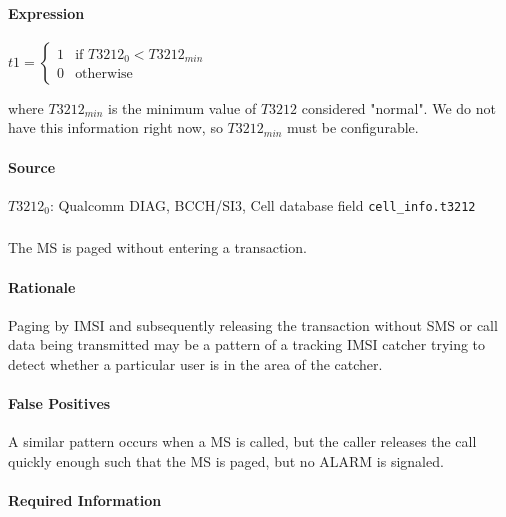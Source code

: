\documentclass[a4paper,11pt,notitlepage,bigheadings,oneside]{scrartcl}
\begin{document}
\paragraph{Expression}

$t1 =
\begin{cases}
	1 	& \text{if } T3212_0 < T3212_{min} \\
	0       & \text{otherwise}
\end{cases}$

where $T3212_{min}$ is the minimum value of $T3212$ considered "normal". We do
not have this information right now, so $T3212_{min}$ must be configurable.

\paragraph{Source}

$T3212_0$: Qualcomm DIAG, BCCH/SI3, Cell database field \verb|cell_info.t3212|



\subsubsection{}

The MS is paged without entering a transaction.

\paragraph{Rationale}

Paging by IMSI and subsequently releasing the transaction without SMS or call
data being transmitted may be a pattern of a tracking IMSI catcher trying to
detect whether a particular user is in the area of the catcher.

\paragraph{False Positives}

A similar pattern occurs when a MS is called, but the caller releases the call
quickly enough such that the MS is paged, but no ALARM is signaled.

\paragraph{Required Information}
\end{document}
